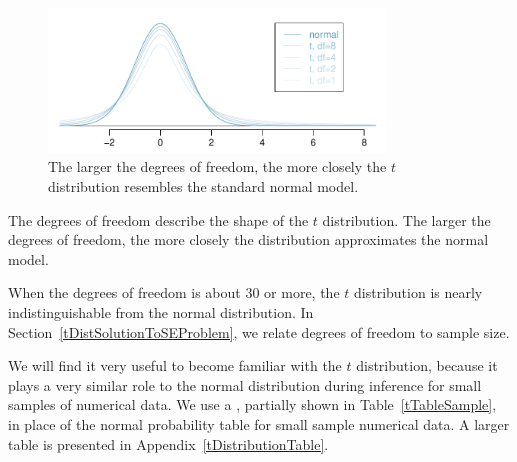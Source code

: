 \begin{figure}
\centering
\includegraphics[width=0.8\textwidth]{05/figures/tDistConvergeToNormalDist/tDistConvergeToNormalDist}
\caption{The larger the degrees of freedom, the more closely the $t$ distribution resembles the standard normal model.}
\label{tDistConvergeToNormalDist}
\end{figure}

\begin{termBox}{
The degrees of freedom describe the shape of the $t$ distribution. The larger the degrees of freedom, the more closely the distribution approximates the normal model.}
\end{termBox}

When the degrees of freedom is about 30 or more, the $t$ distribution is nearly indistinguishable from the normal distribution. In Section~\ref{tDistSolutionToSEProblem}, we relate degrees of freedom to sample size.

We will find it very useful to become familiar with the $t$ distribution, because it plays a very similar role to the normal distribution during inference for small samples of numerical data. We use a , partially shown in Table~\ref{tTableSample}, in place of the normal probability table for small sample numerical data. A larger table is presented in Appendix~\vref{tDistributionTable}.

